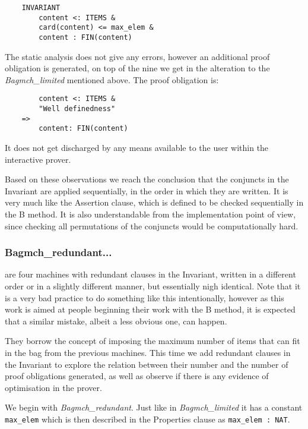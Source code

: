 \documentclass[11pt,journal]{IEEEtran}
\begin{document}
	\begin{lstlisting}
	INVARIANT
		content <: ITEMS &
		card(content) <= max_elem & 
		content : FIN(content)
	\end{lstlisting}
	
	The static analysis does not give any errors, however an additional proof obligation is generated, on top of the nine we get in the alteration to the \emph{Bagmch\_limited} mentioned above. The proof obligation is:
	
	\begin{lstlisting}
    	content <: ITEMS &
		"Well definedness" 
	=>
		content: FIN(content) 
	\end{lstlisting}
	
	It does not get discharged by any means available to the user within the interactive prover.	
	
	Based on these observations we reach the conclusion that the conjuncts in the Invariant are applied sequentially, in the order in which they are written. It is very much like the Assertion clause, which is defined to be checked sequentially in the B method. It is also understandable from the implementation point of view, since checking all permutations of the conjuncts would be computationally hard.
	
	\subsubsection{Bagmch\_redundant...} are four machines with redundant clauses in the Invariant, written in a different order or in a slightly different manner, but essentially nigh identical. Note that it is a very bad practice to do something like this intentionally, however as this work is aimed at people beginning their work with the B method, it is expected that a similar mistake, albeit a less obvious one, can happen.
	
	They borrow the concept of imposing the maximum number of items that can fit in the bag from the previous machines. This time we add redundant clauses in the Invariant to explore the relation between their number and the number of proof obligations generated, as well as observe if there is any evidence of optimisation in the prover.
	
	We begin with \emph{Bagmch\_redundant}. Just like in \emph{Bagmch\_limited} it has a constant \texttt{max\_elem} which is then described in the Properties clause as \texttt{max\_elem : NAT}.
	
\end{document}
